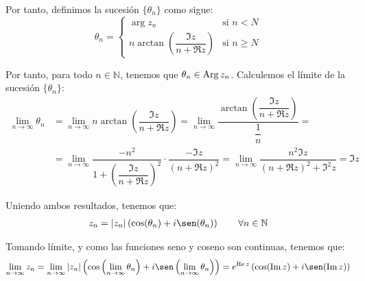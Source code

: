 \begin{ejercicio}
    Por tanto, definimos la sucesión $\{\theta_n\}$ como sigue:
    \begin{equation*}
        \theta_n = \begin{cases}
            \arg z_n & \text{si } n<N\\
            n\arctan\left(\dfrac{\Im z}{n+\Re z}\right) & \text{si } n\geq N
        \end{cases}
    \end{equation*}

    Por tanto, para todo $n\in \mathbb{N}$, tenemos que $\theta_n\in \operatorname{Arg} z_n$. 
    Calculemos el límite de la sucesión $\{\theta_n\}$:
    \begin{align*}
        \lim_{n\to \infty} \theta_n &= \lim_{n\to \infty}n\arctan\left(\dfrac{\Im z}{n+\Re z}\right) = \lim_{n\to \infty}\dfrac{\arctan\left(\dfrac{\Im z}{n+\Re z}\right)}{\dfrac{1}{n}}
        =\\&= \lim_{n\to \infty}\dfrac{-n^2}{1+\left(\dfrac{\Im z}{n+\Re z}\right)^2}\cdot \dfrac{-\Im z}{(n+\Re z)^2}
        = \lim_{n\to \infty}\dfrac{n^2\Im z}{(n+\Re z)^2+\Im^2 z} = \Im z
    \end{align*}
    
    
    Uniendo ambos resultados, tenemos que:
    \begin{align*}
        z_n = |z_n|\left(\cos(\theta_n) + i\sen(\theta_n)\right) \qquad \forall n\in \mathbb{N}
    \end{align*}

    Tomando límite, y como las funciones seno y coseno son continuas, tenemos que:
    \begin{equation*}
        \lim_{n\to \infty}z_n = \lim_{n\to \infty}|z_n|\left(\cos\left(\lim_{n\to \infty}\theta_n\right) + i\sen\left(\lim_{n\to \infty}\theta_n\right)\right) = e^{\Re z}\left(\cos(\Im z) + i\sen(\Im z)\right)
    \end{equation*}
\end{ejercicio}